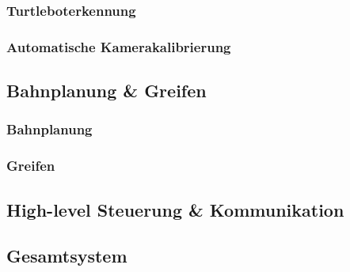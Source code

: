 \documentclass[de,ids]{fziartcl}
\begin{document}
\subsubsection{Turtleboterkennung}
\subsubsection{Automatische Kamerakalibrierung}
\subsection{Bahnplanung \& Greifen}
\subsubsection{Bahnplanung}
\subsubsection{Greifen}
\subsection{High-level Steuerung \& Kommunikation}
\subsection{Gesamtsystem}


\end{document}
